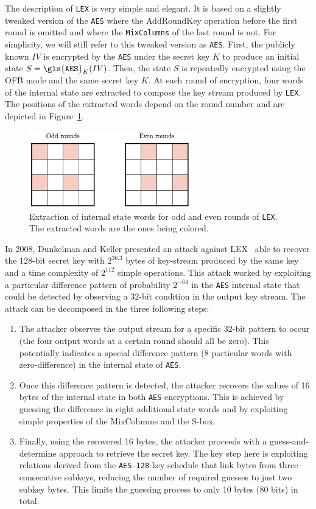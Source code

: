 The description of {\tt LEX} is very simple and elegant. It is based on a slightly tweaked version of the {\tt \gls{AES}} where the {\sf AddRoundKey} operation before the first round is omitted and where the {\tt MixColumns} of the last round is not. For simplicity, we will still refer to this tweaked version as {\tt \gls{AES}}. First, the publicly known $IV$ is encrypted by the {\tt \gls{AES}} under the secret key $K$ to produce an initial state  $S = {\tt \gls{AES}}_K(IV)$. Then, the state $S$ is repeatedly encrypted using the OFB mode and the same secret key $K$. At each round of encryption, four words of the internal state are extracted to compose the key stream produced by {\tt LEX}. The positions of the extracted words depend on the round number and are depicted in Figure~\ref{fig:lex}.

\begin{figure}
  \centering
  \includegraphics[width=7cm]{figures/lex.png}
  \caption{Extraction of internal state words for odd and even rounds of {\tt LEX}\label{fig:lex}. The extracted words are the ones being colored.}
\end{figure}

In 2008, Dunkelman and Keller presented an attack against LEX~\cite{AC:DunKel08b} able to recover the 128-bit secret key with $2^{36.3}$ bytes of key-stream produced by the same key and a time complexity of $2^{112}$ simple operations. This attack worked by exploiting a particular difference pattern of probability $2^{-64}$ in the {\tt \gls{AES}} internal state that could be detected by observing a $32$-bit condition in the output key stream.  The attack can be decomposed  in the three following steps:
\begin{enumerate}
\item  The attacker observes the output stream for a specific 32-bit pattern to occur (the four output words at a certain round should all be zero). This potentially indicates a special difference pattern (8 particular words with zero-difference) in the internal state of {\tt \gls{AES}}. 
\item Once this difference pattern is detected, the attacker recovers the values of 16 bytes of the internal state in both {\tt \gls{AES}} encryptions. This is achieved by guessing the difference in eight additional state words and by exploiting simple properties of the  {\sf MixColumns} and the  S-box. 
\item Finally, using the recovered 16 bytes, the attacker proceeds with a guess-and-determine approach to retrieve the secret key. The key step here is exploiting relations derived from the {\tt \gls{AES}-128} key schedule that link bytes from three consecutive subkeys, reducing the number of required guesses to just two subkey bytes. This limits the guessing process to only 10 bytes (80 bits) in total.
\end{enumerate}

